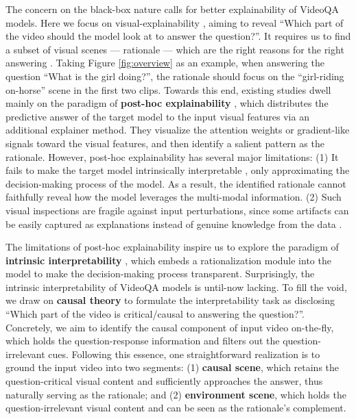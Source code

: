 The concern on the black-box nature calls for better explainability of VideoQA models.
Here we focus on visual-explainability \cite{CSS,DBLP:conf/ijcai/RossHD17}, aiming to reveal ``Which part of the video should the model look at to answer the question?''.
It requires us to find a subset of visual scenes --- rationale --- which are the right reasons for the right answering \cite{DBLP:conf/ijcai/RossHD17}.
Taking Figure \ref{fig:overview} as an example, when answering the question ``What is the girl doing?'', the rationale should focus on the ``girl-riding on-horse'' scene in the first two clips.
Towards this end, existing studies \cite{gao2018motionappearance,DBLP:conf/iccv/Liu0WL21,DBLP:conf/mm/WangG0W21} dwell mainly on the paradigm of \textbf{post-hoc explainability} \cite{LIME,DBLP:conf/iccv/SelvarajuCDVPB17}, which distributes the predictive answer of the target model to the input visual features via an additional explainer method.
They visualize the attention weights or gradient-like signals toward the visual features, and then identify a salient pattern as the rationale.
However, post-hoc explainability has several major limitations:
(1) It fails to make the target model intrinsically interpretable \cite{DBLP:conf/cvpr/YangZQ021,wang2021causal,DBLP:journals/natmi/Rudin19},  only approximating the decision-making process of the model.
As a result, the identified rationale cannot faithfully reveal how the model leverages the multi-modal information.
(2) Such visual inspections are fragile against input perturbations, since some artifacts can be easily captured as explanations instead of genuine knowledge from the data \cite{DBLP:conf/ijcai/LaugelLMRD19,slack2020fooling,heo2019fooling,ghorbani2019interpretation}.




The limitations of post-hoc explainability inspire us to explore the paradigm of \textbf{intrinsic interpretability} \cite{ghorbani2019interpretation,DBLP:journals/natmi/Rudin19}, which embeds a rationalization module into the model to make the decision-making process transparent.
Surprisingly, the intrinsic interpretability of VideoQA models is until-now lacking.
To fill the void, we draw on \textbf{causal theory} \cite{pearl2016causal,pearl2009causal} to formulate the interpretability task as disclosing ``Which part of the video is critical/causal to answering the question?''.
Concretely, we aim to identify the causal component of input video on-the-fly, which holds the question-response information and filters out the question-irrelevant cues.
Following this essence, one straightforward realization is to ground the input video into two segments:
(1) \textbf{causal scene}, which retains the question-critical visual content and sufficiently approaches the answer, thus naturally serving as the rationale;
and (2) \textbf{environment scene}, which holds the question-irrelevant visual content and can be seen as the rationale's complement.



